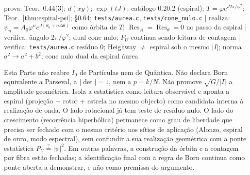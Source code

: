 \documentclass[11pt,a4paper]{article}
\begin{document}
\vspace{0.5em}
\noindent
{\small
prova: Teor.~0.44(3); $d(xy)$; $\exp(tJ)$; catálogo 0.20.2 (espiral);
$T=\varphi e^{J 2\pi/\varphi^2}$; Teor.~\ref{thm:espiral-psi}; §0.64; \texttt{tests/aurea.c},
\texttt{tests/cone\_nulo.c}
\quad|\quad
realiza: $\psi_n=A_0\varphi^n e^{J(\theta_0+n\Delta\theta)}$ como órbita de $T$;
$\operatorname{Res}_A=\operatorname{Res}_\theta=0$ no passo da espiral
\quad|\quad
verifica: ângulo $2\pi/\varphi^2$; dual cone nulo; $P_U$ continua sendo leitura de contagem
\quad|\quad
verifica: \texttt{tests/aurea.c} resíduo 0; Heighway $\neq$ espiral sob o mesmo $|I|$;
norma $a^2\to a^2+b^2$; cone nulo dual da espiral áurea
}

\vspace{1.2em}
\noindent
Esta Parte não reabre $I_0$ de Partículas nem de Quântica.
Não declara Born equivalente a Parseval, a $|\det|=1$, nem a $p=k/N$.
Não promove $\sqrt{G/|I|}$ a amplitude geométrica.
Isola a estatística como leitura observável e aponta a espiral
(projeção + rotor + estrela no mesmo objecto) como candidata interna à realização de onda.
O lado rotacional já tem teste de resíduo nulo. O lado do crescimento (recorrência hiperbólica)
permanece como grau de liberdade que precisa ser fechado com o mesmo critério nos sítios de aplicação
(Alonzo, espiral de ouro, modo espectral), sem confundir a sua realização geométrica com a
ponte estatística $P_U\stackrel{?}{=}|\psi|^2$. Em outras palavras, a construção da órbita e a
contagem por fibra estão fechadas; a identificação final com a regra de Born continua como ponte
aberta a demonstrar, e não como premissa do argumento.
\end{document}

